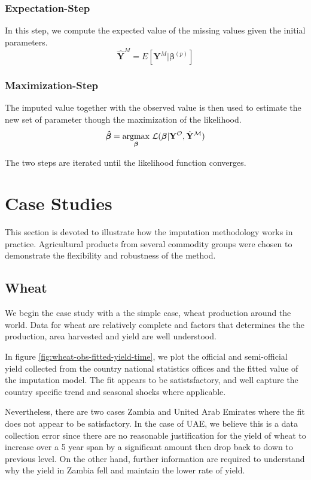 \documentclass[nojss]{jss}\usepackage[]{graphicx}\usepackage[]{color}
\begin{document}
\subsubsection{Expectation-Step}
In this step, we compute the expected value of the missing values
given the initial parameters.
\begin{equation}
  \mathbf{\hat{Y}}^M = E[\mathbf{Y}^M|\boldsymbol{\beta}^{(p)}]
\end{equation}

\subsubsection{Maximization-Step}
The imputed value together with the observed value is then used to
estimate the new set of parameter though the maximization of the
likelihood.
\begin{equation}
  \boldsymbol{\hat{\beta}} = \underset{\boldsymbol{\beta}}
             {\mathrm{argmax}} ~\cal{L}(\boldsymbol{\beta}|\mathbf{Y}^O,
             \mathbf{\hat{Y}}^M)
\end{equation}

The two steps are iterated until the likelihood function converges.



\section{Case Studies}
This section is devoted to illustrate how the imputation methodology
works in practice. Agricultural products from several commodity groups
were chosen to demonstrate the flexibility and robustness of the
method.

\subsection{Wheat}
We begin the case study with a the simple case, wheat production
around the world. Data for wheat are relatively complete and factors
that determines the the production, area harvested and yield are well
understood.




In figure \ref{fig:wheat-obs-fitted-yield-time}, we plot the official
and semi-official yield collected from the country national statistics
offices and the fitted value of the imputation model. The fit appears
to be satistsfactory, and well capture the country specific trend and
seasonal shocks where applicable. 

Nevertheless, there are two cases Zambia and United Arab Emirates where
the fit does not appear to be satisfactory. In the case of UAE, we
believe this is a data collection error since there are no reasonable
justification for the yield of wheat to increase over a 5 year span by
a significant amount then drop back to down to previous level. On the
other hand, further information are required to understand why the
yield in Zambia fell and maintain the lower rate of yield. 
\end{document}
